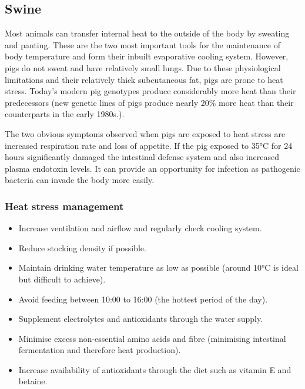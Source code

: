 \documentclass[]{book}
\providecommand{\tightlist}{%
  \setlength{\itemsep}{0pt}\setlength{\parskip}{0pt}}
\begin{document}
\hypertarget{swine}{%
\subsection{Swine}\label{swine}}

Most animals can transfer internal heat to the outside of the body by sweating and panting. These are the two most important tools for the maintenance of body temperature and form their inbuilt evaporative cooling system. However, pigs do not sweat and have relatively small lungs. Due to these physiological limitations and their relatively thick subcutaneous fat, pigs are prone to heat stress. Today's modern pig genotypes produce considerably more heat than their predecessors (new genetic lines of pigs produce nearly 20\% more heat than their counterparts in the early 1980s.).

The two obvious symptoms observed when pigs are exposed to heat stress are increased respiration rate and loss of appetite. If the pig exposed to 35°C for 24 hours significantly damaged the intestinal defense system and also increased plasma endotoxin levels. It can provide an opportunity for infection as pathogenic bacteria can invade the body more easily.

\hypertarget{heat-stress-management-1}{%
\subsubsection{Heat stress management}\label{heat-stress-management-1}}

\begin{itemize}
\tightlist
\item
  Increase ventilation and airflow and regularly check cooling system.
\item
  Reduce stocking density if possible.
\item
  Maintain drinking water temperature as low as possible (around 10°C is ideal but difficult to achieve).
\item
  Avoid feeding between 10:00 to 16:00 (the hottest period of the day).
\item
  Supplement electrolytes and antioxidants through the water supply.
\item
  Minimise excess non-essential amino acids and fibre (minimising intestinal fermentation and therefore heat production).
\item
  Increase availability of antioxidants through the diet such as vitamin E and betaine.
\end{itemize}
\end{document}

